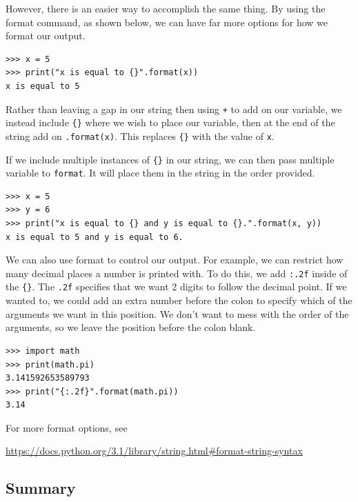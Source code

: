 \documentclass[11pt]{cselabheader}
\begin{document}
However, there is an easier way to accomplish the same thing. By using the format command, as shown below, we can have far more options for how we format our output.

\begin{lstlisting}[style=ipython]
>>> x = 5
>>> print("x is equal to {}".format(x))
x is equal to 5
\end{lstlisting}

Rather than leaving a gap in our string then using \lstinline{+} to add on our variable, we instead include \lstinline!{}! where we wish to place our variable, then at the end of the string add on \lstinline{.format(x)}. This replaces \lstinline!{}! with the value of \lstinline{x}.

If we include multiple instances of \lstinline!{}! in our string, we can then pass multiple variable to \lstinline{format}. It will place them in the string in the order provided.

\begin{lstlisting}[style=ipython]
>>> x = 5
>>> y = 6
>>> print("x is equal to {} and y is equal to {}.".format(x, y))
x is equal to 5 and y is equal to 6.
\end{lstlisting}

We can also use format to control our output. For example, we can restrict how many decimal places a number is printed with. To do this, we add \lstinline{:.2f} inside of the \lstinline!{}!. The \lstinline{.2f} specifies that we want 2 digits to follow the decimal point. If we wanted to, we could add an extra number before the colon to specify which of the arguments we want in this position. We don't want to mess with the order of the arguments, so we leave the position before the colon blank.

\begin{lstlisting}[style=ipython]
>>> import math
>>> print(math.pi)
3.141592653589793
>>> print("{:.2f}".format(math.pi))
3.14
\end{lstlisting}

For more format options, see
\begin{center}
  \vspace{-2mm}
\url{https://docs.python.org/3.1/library/string.html#format-string-syntax}
\vspace{-2mm}

\end{center}

\subsection{Summary}
\end{document}
